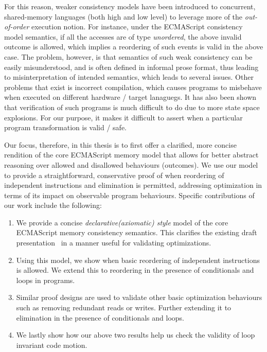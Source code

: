      
    
      
    For this reason, weaker consistency models have been introduced to concurrent, shared-memory languages (both high and low level) to leverage more of the \textit{out-of-order} execution notion. 
    For instance, under the ECMAScript consistency model semantics, if all the accesses are of type \textit{unordered}, the above invalid outcome is allowed, which implies a reordering of such events is valid in the above case. 
    The problem, however, is that semantics of such weak consistency can be easily misunderstood, and is often defined in informal prose format, thus leading to misinterpretation of intended semantics, which leads to several issues. 
    Other problems that exist is incorrect compilation, which causes programs to misbehave when executed on different hardware / target lanaguegs. 
    It has also been shown that verification of such programs is much difficult to do due to more state space explosions.
    For our purpose, it makes it difficult to assert when a particular program transformation is valid / safe. 
    
    Our focus, therefore, in this thesis is to first offer a clarified, more concise rendition of the core ECMAScript memory model that allows for better abstract reasoning over allowed and disallowed behaviours (outcomes). 
    We use our model to provide a straightforward, conservative proof of when reordering of independent instructions and elimination is permitted, addressing optimization in terms of its impact on observable program behaviours. 
    Specific contributions of our work include the following:
    
    \begin{enumerate}
        \item We provide a concise \textit{declarative(axiomatic) style} model of the core ECMAScript memory consistency semantics. This clarifies the existing draft presentation~\cite{ECMA} in a manner useful for validating optimizations.
        \item Using this model, we show when basic reordering of independent instructions is allowed. We extend this to reordering in the presence of conditionals and loops in programs.
        \item Similar proof designs are used to validate other basic optimization behaviours such as removing redundant reads or writes. Further extending it to elimination in the presence of conditionals and loops. 
        \item We lastly show how our above two results help us check the validity of loop invariant code motion. 
    \end{enumerate}
  
